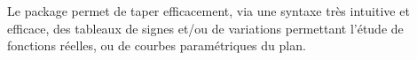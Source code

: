 \documentclass[12pt, a4paper]{article}
\begin{document}
\noindent
Le package  permet de taper efficacement, via une syntaxe très intuitive et efficace, des tableaux de signes et/ou de variations permettant l'étude de fonctions réelles, ou de courbes paramétriques du plan.
\end{document}
